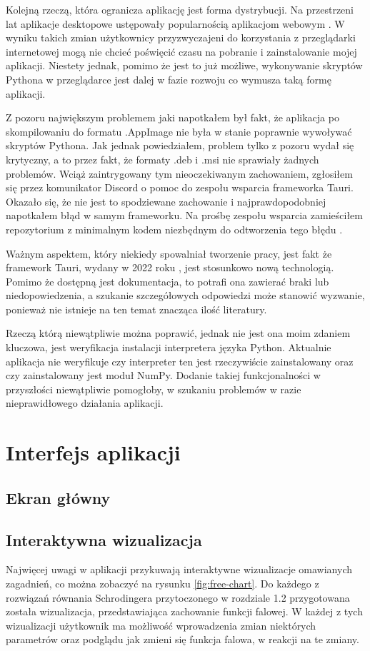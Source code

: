 \documentclass{SGGW-thesis}
\begin{document}
	Kolejną rzeczą, która ogranicza aplikację jest forma dystrybucji. Na przestrzeni lat aplikacje desktopowe ustępowały popularnością aplikacjom webowym \cite{web-vs-desktop}. W wyniku takich zmian użytkownicy przyzwyczajeni do korzystania z przeglądarki internetowej mogą nie chcieć poświęcić czasu na pobranie i zainstalowanie mojej aplikacji. Niestety jednak, pomimo że jest to już możliwe, wykonywanie skryptów Pythona w przeglądarce jest dalej w fazie rozwoju \cite{python-webassembly} co wymusza taką formę aplikacji.
	
	Z pozoru największym problemem jaki napotkałem był fakt, że aplikacja po skompilowaniu do formatu .AppImage nie była w stanie poprawnie wywoływać skryptów Pythona. Jak jednak powiedziałem, problem tylko z pozoru wydał się krytyczny, a to przez fakt, że formaty .deb i .msi nie sprawiały żadnych problemów. Wciąż zaintrygowany tym nieoczekiwanym zachowaniem, zgłosiłem się przez komunikator Discord o pomoc do zespołu wsparcia frameworka Tauri. Okazało się, że nie jest to spodziewane zachowanie i najprawdopodobniej napotkałem błąd w samym frameworku. Na prośbę zespołu wsparcia zamieściłem repozytorium z minimalnym kodem niezbędnym do odtworzenia tego błędu \cite{app-error-repo}.
	
	Ważnym aspektem, który niekiedy spowalniał tworzenie pracy, jest fakt że framework Tauri, wydany w 2022 roku \cite{tauri-release}, jest stosunkowo nową technologią. Pomimo że dostępną jest dokumentacja, to potrafi ona zawierać braki lub niedopowiedzenia, a szukanie szczegółowych odpowiedzi może stanowić wyzwanie, ponieważ nie istnieje na ten temat znacząca ilość literatury.
	
	Rzeczą którą niewątpliwie można poprawić, jednak nie jest ona moim zdaniem kluczowa, jest weryfikacja instalacji interpretera języka Python. Aktualnie aplikacja nie weryfikuje czy interpreter ten jest rzeczywiście zainstalowany oraz czy zainstalowany jest moduł NumPy. Dodanie takiej funkcjonalności w przyszłości niewątpliwie pomogłoby, w szukaniu problemów w razie nieprawidłowego działania aplikacji.
	

\chapter{Interfejs aplikacji}
	\section{Ekran główny}
	\section{Interaktywna wizualizacja}
	Najwięcej uwagi w aplikacji przykuwają interaktywne wizualizacje omawianych zagadnień, co można zobaczyć na rysunku \ref{fig:free-chart}. Do każdego z rozwiązań równania Schrodingera przytoczonego w rozdziale 1.2 przygotowana została wizualizacja, przedstawiająca zachowanie funkcji falowej. W każdej z tych wizualizacji użytkownik ma możliwość wprowadzenia zmian niektórych parametrów oraz podglądu jak zmieni się funkcja falowa, w reakcji na te zmiany.
	
\end{document}
